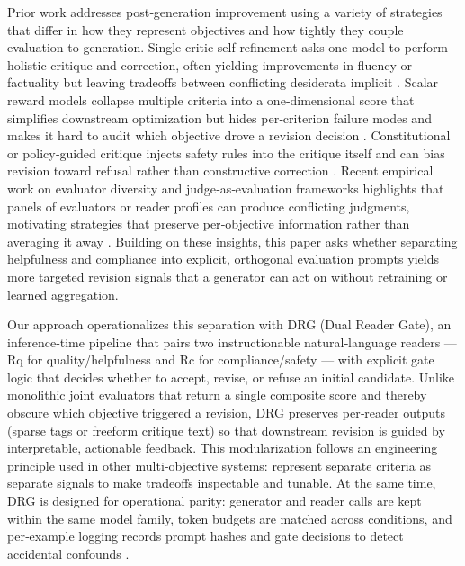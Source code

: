 \documentclass{article}
\begin{document}
Prior work addresses post‑generation improvement using a variety of strategies that differ in how they represent objectives and how tightly they couple evaluation to generation. Single‑critic self‑refinement asks one model to perform holistic critique and correction, often yielding improvements in fluency or factuality but leaving tradeoffs between conflicting desiderata implicit \cite{giulianelli2022pragmatic, zhang2024evaluation}. Scalar reward models collapse multiple criteria into a one‑dimensional score that simplifies downstream optimization but hides per‑criterion failure modes and makes it hard to audit which objective drove a revision decision \cite{liu2022pretrain, chung2022scaling}. Constitutional or policy‑guided critique injects safety rules into the critique itself and can bias revision toward refusal rather than constructive correction \cite{ivgi2024loops, lu2025argus}. Recent empirical work on evaluator diversity and judge‑as‑evaluation frameworks highlights that panels of evaluators or reader profiles can produce conflicting judgments, motivating strategies that preserve per‑objective information rather than averaging it away \cite{marco2025reader}. Building on these insights, this paper asks whether separating helpfulness and compliance into explicit, orthogonal evaluation prompts yields more targeted revision signals that a generator can act on without retraining or learned aggregation.

Our approach operationalizes this separation with DRG (Dual Reader Gate), an inference‑time pipeline that pairs two instructionable natural‑language readers --- Rq for quality/helpfulness and Rc for compliance/safety --- with explicit gate logic that decides whether to accept, revise, or refuse an initial candidate. Unlike monolithic joint evaluators that return a single composite score and thereby obscure which objective triggered a revision, DRG preserves per‑reader outputs (sparse tags or freeform critique text) so that downstream revision is guided by interpretable, actionable feedback. This modularization follows an engineering principle used in other multi‑objective systems: represent separate criteria as separate signals to make tradeoffs inspectable and tunable. At the same time, DRG is designed for operational parity: generator and reader calls are kept within the same model family, token budgets are matched across conditions, and per‑example logging records prompt hashes and gate decisions to detect accidental confounds \cite{liu2024reife}.
\end{document}
